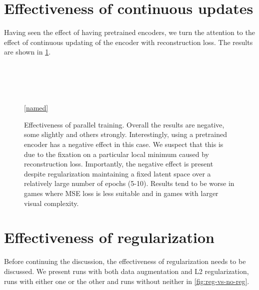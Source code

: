 \section{Effectiveness of continuous updates}
\label{sec-effectiveness-of-parallel}
Having seen the effect of having pretrained encoders, we turn the attention
to the effect of continuous updating of the encoder with reconstruction loss.
The results are shown in \ref{fig-parallel}.

\begin{figure}[!t]
  \captionsetup[subfloat]{position=top,labelformat=empty}
  \vspace{-1.5cm}
  \centering

    \subfloat[]{  \resizebox{0.4\textwidth}{!}{}}
    \subfloat[]{  \resizebox{0.4\textwidth}{!}{}}\\
  \vspace{-1cm}
    \subfloat[]{  \resizebox{0.4\textwidth}{!}{}}
    \subfloat[]{  \resizebox{0.4\textwidth}{!}{}}\\
  \vspace{-1cm}
    \subfloat[]{  \resizebox{0.4\textwidth}{!}{}}
    \subfloat[]{  \resizebox{0.4\textwidth}{!}{}}\\
  \vspace{-1cm}
    \subfloat[]{  \resizebox{0.4\textwidth}{!}{}}
  \\

  \ref{named}
  \caption{Effectiveness of parallel training. Overall the results are negative, some slightly
  and others strongly. Interestingly, using a pretrained encoder has a negative effect
in this case. We suspect that this is due to the fixation on a particular local minimum caused
by reconstruction loss. Importantly, the negative effect is present despite
regularization maintaining a fixed latent space over a relatively large number of epochs (5-10).
Results tend to be worse in games where MSE loss is less suitable and in games
with larger visual complexity.}
  \label{fig-parallel}
\end{figure}

\section{Effectiveness of regularization}
\label{sec-effectiveness-of-reg}
Before continuing the discussion, the effectiveness of regularization needs to be discussed.
We present runs with both data augmentation and L2 regularization, runs with either one or the other and
runs without neither in \ref{fig:reg-vs-no-reg}.


